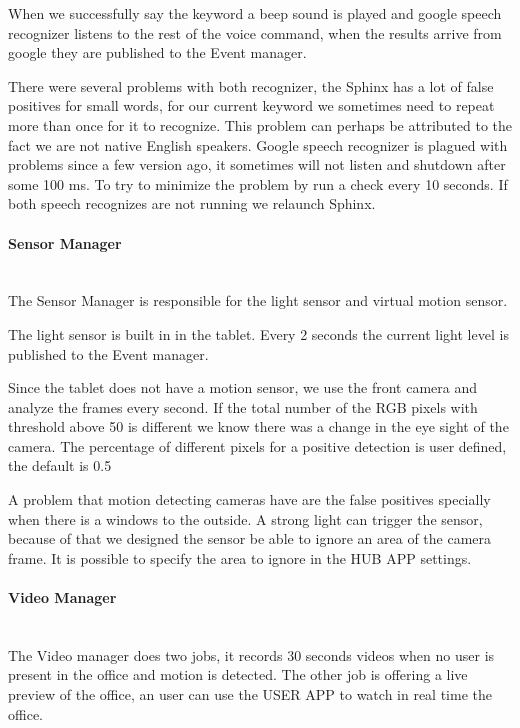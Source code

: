 When we successfully say the keyword a beep sound is played and google speech recognizer listens to the rest of the voice command, when the results arrive from google they are published to the Event manager.

There were several problems with both recognizer, the Sphinx has a lot of false positives for small words, for our current keyword we sometimes need to repeat more than once for it to recognize. This problem can perhaps be attributed to the fact we are not native English speakers. 
Google speech recognizer is plagued with problems since a few version ago, it sometimes will not listen and shutdown after some 100 ms. To try to minimize the problem by run a check every 10 seconds. If both speech recognizes are not running we relaunch Sphinx.

\paragraph{Sensor Manager}\mbox{}\\

The Sensor Manager is responsible for the light sensor and virtual motion sensor.

The light sensor is built in in the tablet. Every 2 seconds the current light level is published to the Event manager. 

Since the tablet does not have a motion sensor, we use the front camera and analyze the frames every second. If the total number of the RGB pixels with threshold above 50 is different we know there was a change in the eye sight of the camera. The percentage of different pixels for a positive detection is user defined, the default is 0.5%

A problem that motion detecting cameras have are the false positives specially when there is a windows to the outside. A strong light can trigger the sensor, because of that we designed the sensor be able to ignore an area of the camera frame. It is possible to specify the area to ignore in the HUB APP settings.


\paragraph{Video Manager}\mbox{}\\

The Video manager does two jobs, it records 30 seconds videos when no user is present in the office and motion is detected. The other job is offering a live preview of the office, an user can use the USER APP to watch in real time the office.

